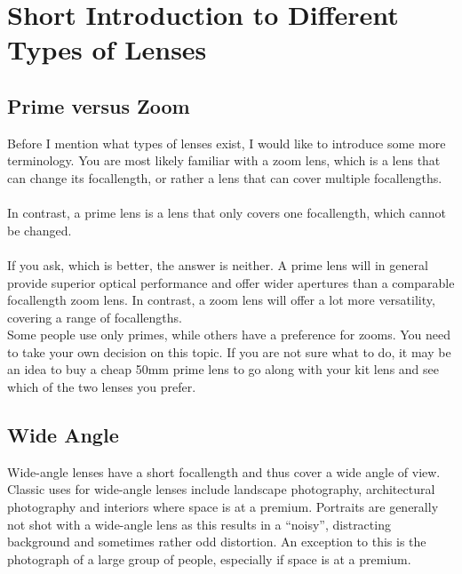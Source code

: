 \section{Short Introduction to Different Types of Lenses}
\label{sec:Introduction-Types-Lenses}

\subsection{Prime versus Zoom}
\label{subsec:Prime-versus-Zoom}

Before I mention what types of lenses exist, I would like to introduce some more terminology. You are most likely familiar with a \gls{zoom} lens, which is a lens that can change its \gls{focallength}, or rather a lens that can cover multiple \glspl{focallength}.
\\
\\
In contrast, a \gls{prime} lens is a lens that only covers one \gls{focallength}, which cannot be changed.
\\
\\
If you ask, which is better, the answer is neither. A \gls{prime} lens will in general provide superior optical performance and offer wider apertures than a comparable \gls{focallength} \gls{zoom} lens. In contrast, a \gls{zoom} lens will offer a lot more versatility, covering a range of \glspl{focallength}.
\\
Some people use only \glspl{prime}, while others have a preference for \glspl{zoom}. You need to take your own decision on this topic. If you are not sure what to do, it may be an idea to buy a cheap 50mm \gls{prime} lens to go along with your kit lens and see which of the two lenses you prefer.

\subsection{Wide Angle}

Wide-angle lenses have a short \gls{focallength} and thus cover a wide angle of view.
\\
Classic uses for wide-angle lenses include landscape photography, architectural photography and interiors where space is at a premium. Portraits are generally not shot with a wide-angle lens as this results in a ``noisy'', distracting background and sometimes rather odd distortion. An exception to this is the photograph of a large group of people, especially if space is at a premium.

